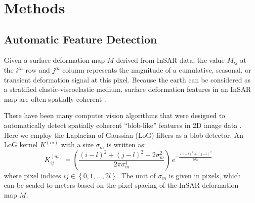 \documentclass{utexasthesis}
\begin{document}
\section{Methods}
\label{sec:methods}



\subsection{Automatic Feature Detection}
\label{subsec:methods-1-log}

Given a surface deformation map $M$ derived from InSAR data, the value $ M_{ij} $ at the $i^{th}$ row and $j^{th}$ column represents the magnitude of a cumulative, seasonal, or transient deformation signal at this pixel. Because the earth can be considered as a stratified elastic-viscoelastic medium, surface deformation features in an InSAR map are often spatially coherent \citep{Segall2010EarthquakeVolcanoDeformation}.

There have been many computer vision algorithms that were designed to automatically detect spatially coherent ``blob-like'' features in 2D image data \citep{Lindeberg1993DetectingSalientBlob, Lindeberg1998FeatureDetectionAutomatic, Lowe2004DistinctiveImageFeatures}. Here we employ the Laplacian of Gaussian (LoG) filters as a blob detector. An LoG kernel $K^{(m)}$ with a size $\sigma_m$ is written as:
\begin{equation}
K^{(m)}_{ij} = \left(\frac{(i - l)^2 + (j - l)^2 - 2\sigma_m^2}{2 \pi \sigma_m^4}\right) \, e^{-\frac{ (i - l)^2 + (j - l)^2}{2 \sigma_m^2}} \label{eq:log-kernel}
\end{equation}
where pixel indices $ij  \in \left\lbrace 0, 1, \ldots, 2l \right\rbrace$. The unit of $\sigma_m$ is given in pixels, which can be scaled to meters based on the pixel spacing of the InSAR deformation map $M$.
\end{document}
